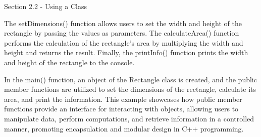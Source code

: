 \begin{notes}{Section 2.2 - Using a Class}
\begin{highlight}
        The setDimensions() function allows users to set the width and height of the rectangle by passing the values as parameters. The calculateArea() function performs the calculation of the rectangle's area by multiplying the width and height and returns the 
        result. Finally, the printInfo() function prints the width and height of the rectangle to the console.
    
        In the main() function, an object of the Rectangle class is created, and the public member functions are utilized to set the dimensions of the rectangle, calculate its area, and print the information. This example showcases how public member functions 
        provide an interface for interacting with objects, allowing users to manipulate data, perform computations, and retrieve information in a controlled manner, promoting encapsulation and modular design in C++ programming.
    \end{highlight}
\end{notes}

